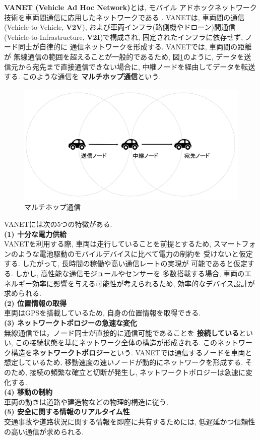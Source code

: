 \textbf{VANET (Vehicle Ad Hoc Network)}とは, モバイル
アドホックネットワーク技術を車両間通信に応用したネットワークである
\cite{adhoc,vanet}. VANETは, 車両間の通信(Vehicle-to-Vehicle, 
\textbf{V2V}), および車両インフラ(路側機やドローン)間通信
(Vehicle-to-Infrastructure, \textbf{V2I})\cite{drone}で構成され, 
固定されたインフラに依存せず, ノード同士が自律的に
通信ネットワークを形成する. VANETでは, 車両間の距離が
無線通信の範囲を超えることが一般的であるため, 図\ref{fig:vanet}のように, 
データを送信元から宛先まで直接通信できない場合に, 
中継ノードを経由してデータを転送する. このような通信を
\textbf{マルチホップ通信}という.

\begin{figure}
  \centering
  \includegraphics[scale=0.6]{figures/vanet.png}
  \caption{マルチホップ通信}
  \label{fig:vanet}
\end{figure}

VANETには次の5つの特徴がある.\\[0.5em]
\noindent\textbf{(1) 十分な電力供給}\\
\indent VANETを利用する際, 車両は走行していることを前提とするため, 
スマートフォンのような電池駆動のモバイルデバイスに比べて電力の制約を
受けないと仮定する. したがって, 長時間の稼働や高い通信レートの実現が
可能であると仮定する. しかし, 高性能な通信モジュールやセンサーを
多数搭載する場合, 車両のエネルギー効率に影響を与える可能性が考えられるため, 
効率的なデバイス設計が求められる.\\[1em]
\noindent\textbf{(2) 位置情報の取得}\\
\indent 車両はGPSを搭載しているため, 自身の位置情報を取得できる.\\[1em]
\noindent\textbf{(3) ネットワークトポロジーの急速な変化}\\
\indent 無線通信では，ノード同士が直接的に通信可能であることを
\textbf{接続している}といい, この接続状態を基にネットワーク全体の構造が形成される. 
このネットワーク構造を\textbf{ネットワークトポロジー}という. 
VANETでは通信するノードを車両と想定しているため, 
移動速度の速いノードが動的にネットワークを形成する. 
そのため, 接続の頻繁な確立と切断が発生し, 
ネットワークトポロジーは急速に変化する. \\[1em]
\noindent\textbf{(4) 移動の制約}\\
\indent 車両の動きは道路や建造物などの物理的構造に従う.\\[1em]
\noindent\textbf{(5) 安全に関する情報のリアルタイム性}\\
\indent 交通事故や道路状況に関する情報を即座に共有するためには, 
低遅延かつ信頼性の高い通信が求められる.\\

